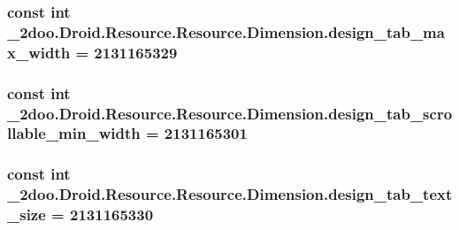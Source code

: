 \hypertarget{class__2doo_1_1_droid_1_1_resource_1_1_dimension_4fbb317fc5d589d9694abff275693793}{
\subsubsection[{design\_\-tab\_\-max\_\-width}]{\setlength{\rightskip}{0pt plus 5cm}const int \_\-2doo.Droid.Resource.Resource.Dimension.design\_\-tab\_\-max\_\-width = 2131165329}}
\label{class__2doo_1_1_droid_1_1_resource_1_1_dimension_4fbb317fc5d589d9694abff275693793}


\hypertarget{class__2doo_1_1_droid_1_1_resource_1_1_dimension_c6387356daf398a30dd39f238d56a3ab}{
\subsubsection[{design\_\-tab\_\-scrollable\_\-min\_\-width}]{\setlength{\rightskip}{0pt plus 5cm}const int \_\-2doo.Droid.Resource.Resource.Dimension.design\_\-tab\_\-scrollable\_\-min\_\-width = 2131165301}}
\label{class__2doo_1_1_droid_1_1_resource_1_1_dimension_c6387356daf398a30dd39f238d56a3ab}


\hypertarget{class__2doo_1_1_droid_1_1_resource_1_1_dimension_b6dadd739ac426aca200337e83f450b8}{
\subsubsection[{design\_\-tab\_\-text\_\-size}]{\setlength{\rightskip}{0pt plus 5cm}const int \_\-2doo.Droid.Resource.Resource.Dimension.design\_\-tab\_\-text\_\-size = 2131165330}}
\label{class__2doo_1_1_droid_1_1_resource_1_1_dimension_b6dadd739ac426aca200337e83f450b8}


